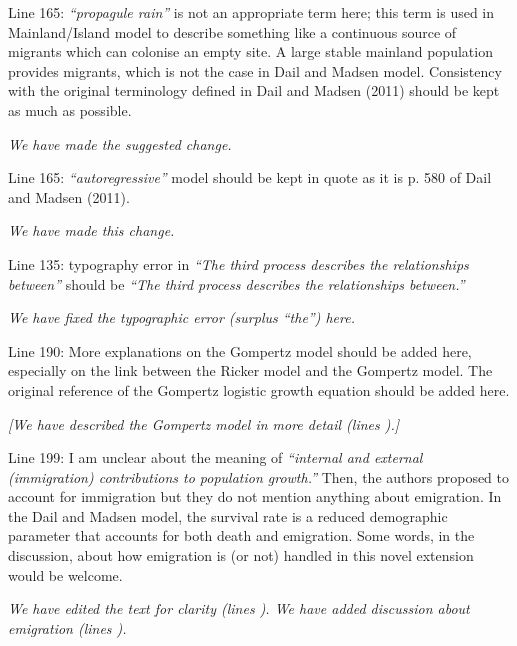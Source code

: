 \documentclass[12pt,english]{article}
\begin{document}
\begin{spacing}{1.9}
\begin{flushleft}
Line 165: \textit{``propagule rain''} is not an appropriate term here; this term is used in
Mainland/Island model to describe something like a continuous source of migrants which
can colonise an empty site. A large stable mainland population provides migrants, which is
not the case in Dail and Madsen model. Consistency with the original terminology defined in
Dail and Madsen (2011) should be kept as much as possible.

\vspace{0.5cm}
\textit{We have made the suggested change.}
\vspace{0.5cm}

Line 165: \textit{``autoregressive''} model should be kept in quote as it is p. 580 of Dail and Madsen
(2011).

\vspace{0.5cm}
\textit{We have made this change.}
\vspace{0.5cm}

Line 135: typography error in \textit{``The third process describes the relationships between''} should
be \textit{``The third process describes the relationships between.''}

\vspace{0.5cm}
\textit{We have fixed the typographic error (surplus ``the'') here.}
\vspace{0.5cm}

Line 190: More explanations on the Gompertz model should be added here, especially on
the link between the Ricker model and the Gompertz model. The original reference of the
Gompertz logistic growth equation should be added here.

\vspace{0.5cm}
\textit{[We have described the Gompertz model in more 
detail (lines ).]}

\vspace{0.5cm}

Line 199: I am unclear about the meaning of \textit{``internal and external (immigration)
contributions to population growth.''} Then, the authors proposed to account for immigration
but they do not mention anything about emigration. In the Dail and Madsen model, the
survival rate is a reduced demographic parameter that accounts for both death and
emigration. Some words, in the discussion, about how emigration is (or not) handled in this
novel extension would be welcome.

\vspace{0.5cm}
\textit{We have edited the text for clarity (lines ).  We have added discussion about emigration
(lines ).}
\vspace{0.5cm}


\end{flushleft}
\end{spacing}
\end{document}
